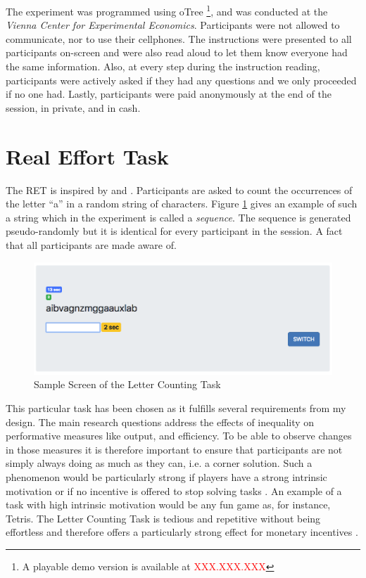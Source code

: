    The experiment was programmed using oTree \citep{chen2016}\footnote{A playable demo version is available at \textcolor{red}{XXX.XXX.XXX}}, and was conducted at the \textit{Vienna Center for Experimental Economics}. Participants were not allowed to communicate, nor to use their cellphones. The instructions were presented to all participants on-screen and were also read aloud to let them know everyone had the same information. Also, at every step during the instruction reading, participants were actively asked if they had any questions and we only proceeded if no one had. Lastly, participants were paid anonymously at the end of the session, in private, and in cash.
    
    
    \section{Real Effort Task}
    \label{sec:RET}
    
    The RET is inspired by \cite{rey-biel2016} and \cite{giusti2014}. Participants are asked to count the occurrences of the letter ``a'' in a random string of characters. Figure \ref{fig:LC_screen} gives an example of such a string which in the experiment is called a \textit{sequence}. The sequence is generated pseudo-randomly but it is identical for every participant in the session. A fact that all participants are made aware of.\\ 
    
    \begin{figure}
        \centering
        \includegraphics[width=\textwidth]{graphs/screenshot_RET_alone.png}
        \caption{Sample Screen of the Letter Counting Task}
        \label{fig:LC_screen}
    \end{figure}
    
    This particular task has been chosen as it fulfills several requirements from my design. The main research questions address the effects of inequality on performative measures like output, and efficiency. To be able to observe changes in those measures it is therefore important to ensure that participants are not simply always doing as much as they can, i.e. a corner solution. Such a phenomenon would be particularly strong if players have a strong intrinsic motivation or if no incentive is offered to stop solving tasks \citep{frey1997}. An example of a task with high intrinsic motivation would be any fun game as, for instance, Tetris.
    The Letter Counting Task is tedious and repetitive without being effortless and therefore offers a particularly strong effect for monetary incentives \citep{cerasoli2014}.\\
    

